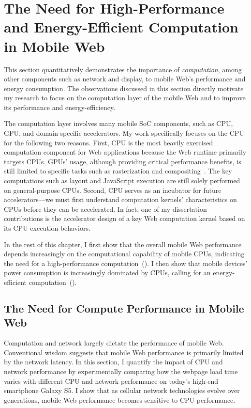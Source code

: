 
\chapter{The Need for High-Performance and Energy-Efficient Computation in Mobile Web}
\label{sec:motivation}

This section quantitatively demonstrates the importance of \textit{computation}, among other components such as network and display, to mobile Web's performance and energy consumption. The observations discussed in this section directly motivate my research to focus on the computation layer of the mobile Web and to improve its performance and energy-efficiency.

The computation layer involves many mobile SoC components, such as CPU, GPU, and domain-specific accelerators. My work specifically focuses on the CPU for the following two reasons. First, CPU is the most heavily exercised computation component for Web applications because the Web runtime primarily targets CPUs. GPUs' usage, although providing critical performance benefits, is still limited to specific tasks such as rasterization and compositing~\cite{gpucompositor}. The key computations such as layout and JavaScript execution are still solely performed on general-purpose CPUs. Second, CPU serves as an incubator for future accelerators---we must first understand computation kernels' characteristics on CPUs before they can be accelerated. In fact, one of my dissertation contributions is the accelerator design of a key Web computation kernel based on its CPU execution behaviors.

In the rest of this chapter, I first show that the overall mobile Web performance depends increasingly on the computational capability of mobile CPUs, indicating the need for a high-performance computation~(). I then show that mobile devices' power consumption is increasingly dominated by CPUs, calling for an energy-efficient computation~().

\section{The Need for Compute Performance in Mobile Web}
\label{sec:motivation:perf}

Computation and network largely dictate the performance of mobile Web. Conventional wisdom suggests that mobile Web performance is primarily limited by the network latency. In this section, I quantify the impact of CPU and network performance by experimentally comparing how the webpage load time varies with different CPU and network performance on today's high-end smartphone Galaxy S5. I show that as cellular network technologies evolve over generations, mobile Web performance becomes sensitive to CPU performance.

